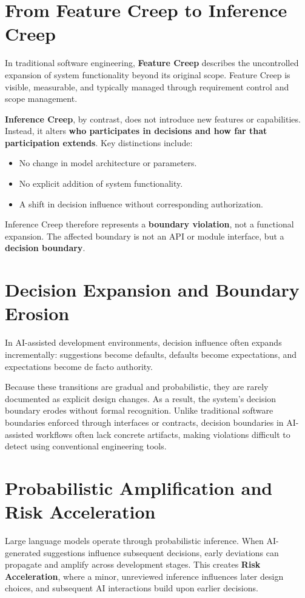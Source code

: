 \documentclass[11pt, a4paper]{article}
\providecommand{\tightlist}{%
  \setlength{\itemsep}{0pt}\setlength{\parskip}{0pt}}
\begin{document}
\section{From Feature Creep to Inference Creep}
In traditional software engineering, \textbf{Feature Creep} describes the uncontrolled expansion of system functionality beyond its original scope. Feature Creep is visible, measurable, and typically managed through requirement control and scope management.

\textbf{Inference Creep}, by contrast, does not introduce new features or capabilities. Instead, it alters \textbf{who participates in decisions and how far that participation extends}. Key distinctions include:

\begin{itemize}
\tightlist
\item No change in model architecture or parameters.
\item No explicit addition of system functionality.
\item A shift in decision influence without corresponding authorization.
\end{itemize}

Inference Creep therefore represents a \textbf{boundary violation}, not a functional expansion. The affected boundary is not an API or module interface, but a \textbf{decision boundary}.

\section{Decision Expansion and Boundary Erosion}
In AI-assisted development environments, decision influence often expands incrementally: suggestions become defaults, defaults become expectations, and expectations become de facto authority.

Because these transitions are gradual and probabilistic, they are rarely documented as explicit design changes. As a result, the system's decision boundary erodes without formal recognition. Unlike traditional software boundaries enforced through interfaces or contracts, decision boundaries in AI-assisted workflows often lack concrete artifacts, making violations difficult to detect using conventional engineering tools.

\section{Probabilistic Amplification and Risk Acceleration}
Large language models operate through probabilistic inference. When AI-generated suggestions influence subsequent decisions, early deviations can propagate and amplify across development stages. This creates \textbf{Risk Acceleration}, where a minor, unreviewed inference influences later design choices, and subsequent AI interactions build upon earlier decisions.
\end{document}
